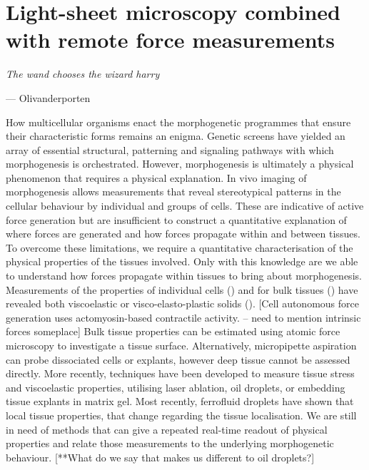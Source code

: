 \ifpdf
    \graphicspath{{Chapter/tweezers/Figs/Raster/}{Chapter/tweezers/Figs/PDF/}{Chapter/tweezers/Figs/}}
\else
    \graphicspath{{Chapter/tweezers/Figs/Vector/}{Chapter/tweezers/Figs/}}
\fi
\chapter[Light-sheet microscopy combined with remote force measurements]{Light-sheet microscopy combined with remote force measurements}%
\epigraph{\textit{The wand chooses the wizard harry}}{--- Olivanderporten}
How multicellular organisms enact the morphogenetic programmes that ensure their characteristic forms remains an enigma.
Genetic screens have yielded an array of essential structural, patterning and signaling pathways with which morphogenesis is orchestrated.
However, morphogenesis is ultimately a physical phenomenon that requires a physical explanation.
In vivo imaging of morphogenesis allows measurements that reveal stereotypical patterns in the cellular behaviour by individual and groups of cells.
These are indicative of active force generation but are insufficient to construct a quantitative explanation of where forces are generated and how forces propagate within and between tissues.
To overcome these limitations, we require a quantitative characterisation of the physical properties of the tissues involved.
Only with this knowledge are we able to understand how forces propagate within tissues to bring about morphogenesis.
Measurements of the properties of individual cells () and for bulk tissues () have revealed both viscoelastic or visco-elasto-plastic solids ().
[Cell autonomous force generation uses actomyosin-based contractile activity. – need to mention intrinsic forces someplace]   Bulk tissue properties can be estimated using atomic force microscopy to investigate a tissue surface.
Alternatively, micropipette aspiration can probe dissociated cells or explants, however deep tissue cannot be assessed directly.
More recently, techniques have been developed to measure tissue stress and viscoelastic properties, utilising laser ablation,  oil droplets, or embedding tissue explants in matrix gel.
Most recently, ferrofluid droplets have shown that local tissue properties, that change regarding the tissue localisation.
We are still in need of methods that can give a repeated real-time readout of physical properties and relate those measurements to the underlying morphogenetic behaviour.
[**What do we say that makes us different to oil droplets?]

